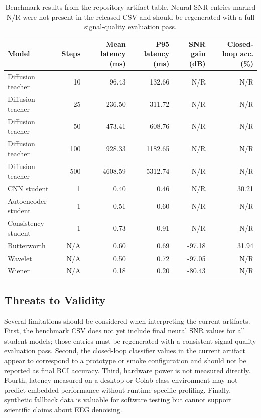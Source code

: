 \documentclass[11pt]{article}
\begin{document}
\begin{table}[H]
    \centering
    \caption{Benchmark results from the repository artifact table. Neural SNR entries marked N/R were not present in the released CSV and should be regenerated with a full signal-quality evaluation pass.}
    \label{tab:benchmark}
    \scriptsize
    \begin{tabular}{lrrrrr}
        \toprule
        Model & Steps & Mean latency (ms) & P95 latency (ms) & SNR gain (dB) & Closed-loop acc. (\%) \\
        \midrule
        Diffusion teacher & 10 & 96.43 & 132.66 & N/R & N/R \\
        Diffusion teacher & 25 & 236.50 & 311.72 & N/R & N/R \\
        Diffusion teacher & 50 & 473.41 & 608.76 & N/R & N/R \\
        Diffusion teacher & 100 & 928.33 & 1182.65 & N/R & N/R \\
        Diffusion teacher & 500 & 4608.59 & 5312.74 & N/R & N/R \\
        CNN student & 1 & 0.40 & 0.46 & N/R & 30.21 \\
        Autoencoder student & 1 & 0.51 & 0.60 & N/R & N/R \\
        Consistency student & 1 & 0.73 & 0.91 & N/R & N/R \\
        Butterworth & N/A & 0.60 & 0.69 & -97.18 & 31.94 \\
        Wavelet & N/A & 0.50 & 0.72 & -97.05 & N/R \\
        Wiener & N/A & 0.18 & 0.20 & -80.43 & N/R \\
        \bottomrule
    \end{tabular}
\end{table}

\subsection{Threats to Validity}

Several limitations should be considered when interpreting the current artifacts. First, the benchmark CSV does not yet include final neural SNR values for all student models; those entries must be regenerated with a consistent signal-quality evaluation pass. Second, the closed-loop classifier values in the current artifact appear to correspond to a prototype or smoke configuration and should not be reported as final BCI accuracy. Third, hardware power is not measured directly. Fourth, latency measured on a desktop or Colab-class environment may not predict embedded performance without runtime-specific profiling. Finally, synthetic fallback data is valuable for software testing but cannot support scientific claims about EEG denoising.
\end{document}
